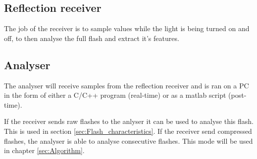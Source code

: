 \subsection{Reflection receiver}
The job of the receiver is to sample values while the light is being turned on and off, to then analyse the full flash and extract it's features. 


\subsection{Analyser}
The analyser will receive samples from the reflection receiver and is ran on a PC in the form of either a C/C++ program (real-time) or as a matlab script (post-time).

If the receiver sends raw flashes to the anlyser it can be used to analyse this flash. This is used in section \ref{sec:Flash_characteristics}. If the receiver send compressed flashes, the analyser is able to analyse consecutive flashes. This mode will be used in chapter \ref{sec:Algorithm}.
